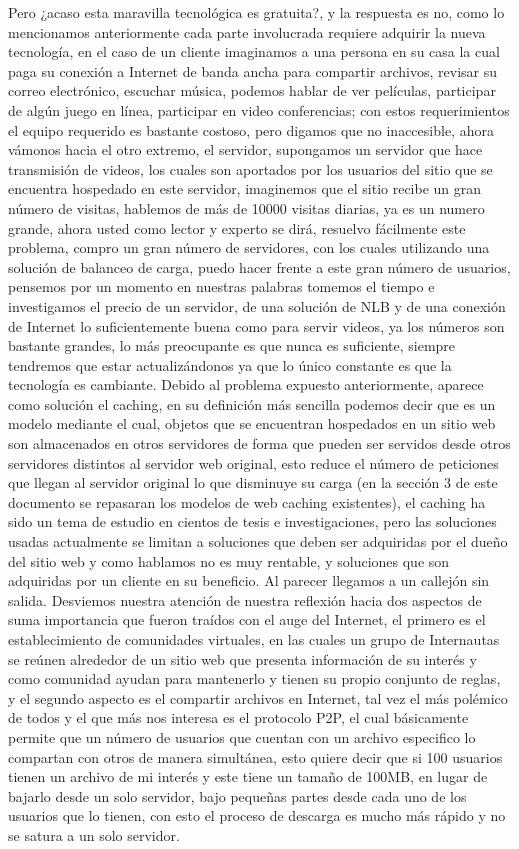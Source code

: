 Pero ¿acaso esta maravilla tecnológica es gratuita?, y la respuesta es no, como lo mencionamos anteriormente cada parte involucrada requiere adquirir la nueva tecnología, en el caso de un cliente imaginamos a una persona en su casa la cual paga su conexión a Internet de banda ancha para compartir archivos, revisar su correo electrónico, escuchar música, podemos hablar de ver películas, participar de algún juego en línea, participar en video conferencias; con estos requerimientos el equipo requerido es bastante costoso, pero digamos que no inaccesible, ahora vámonos hacia el otro extremo, el servidor, supongamos un servidor que hace transmisión de videos, los cuales son aportados por los usuarios del sitio que se encuentra hospedado en este servidor, imaginemos que el sitio recibe un gran número de visitas, hablemos de más de 10000 visitas diarias, ya es un numero grande, ahora usted como lector y experto se dirá, resuelvo fácilmente este problema, compro un gran número de servidores, con los cuales utilizando una solución de balanceo de carga, puedo hacer frente a este gran número de usuarios, pensemos por un momento en nuestras palabras tomemos el tiempo e investigamos el precio de un servidor, de una solución de NLB y de una conexión de Internet lo suficientemente buena como para servir videos, ya los números son bastante grandes, lo más preocupante es que nunca es suficiente, siempre tendremos que estar actualizándonos ya que lo único constante es que la tecnología es cambiante.
Debido al problema expuesto anteriormente, aparece como solución el caching, en su definición más sencilla podemos decir que es un modelo mediante el cual, objetos que se encuentran hospedados en un sitio web son almacenados en otros servidores de forma que pueden ser servidos desde otros servidores distintos al servidor web original, esto reduce el número de peticiones que llegan al servidor original lo que disminuye su carga (en la sección 3 de este documento se repasaran los modelos de web caching existentes), el caching ha sido un tema de estudio en cientos de tesis e investigaciones, pero las soluciones usadas actualmente se limitan a soluciones que deben ser adquiridas por el dueño del sitio web y como hablamos no es muy rentable, y soluciones que son adquiridas por un cliente en su beneficio. Al parecer llegamos a un callejón sin salida.
Desviemos nuestra atención de nuestra reflexión hacia dos aspectos de suma importancia que fueron traídos con el auge del Internet, el primero es el establecimiento de comunidades virtuales, en las cuales un grupo de Internautas se reúnen alrededor de un sitio web que presenta información de su interés y como comunidad ayudan para mantenerlo y tienen su propio conjunto de reglas, y el segundo aspecto es el compartir archivos en Internet, tal vez el más polémico de todos y el que más nos interesa es el protocolo P2P, el cual básicamente permite que un número de usuarios que cuentan con un archivo especifico lo compartan con otros de manera simultánea, esto quiere decir que si 100 usuarios tienen un archivo de mi interés y este tiene un tamaño de 100MB, en lugar de bajarlo desde un solo servidor, bajo pequeñas partes desde cada uno de los usuarios que lo tienen, con esto el proceso de descarga es mucho más rápido y no se satura a un solo servidor.
